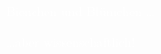 \documentclass{beamer}
\begin{document}
{
\begin{frame}
\begin{flushright}{\textcolor{white}{Bienchen und Blümchen \dots} }\\[8cm]
\end{flushright}
\pause
\textcolor{white}{\dots aber wissenschaftlich!}
\end{frame} 
}

 
\end{document}
